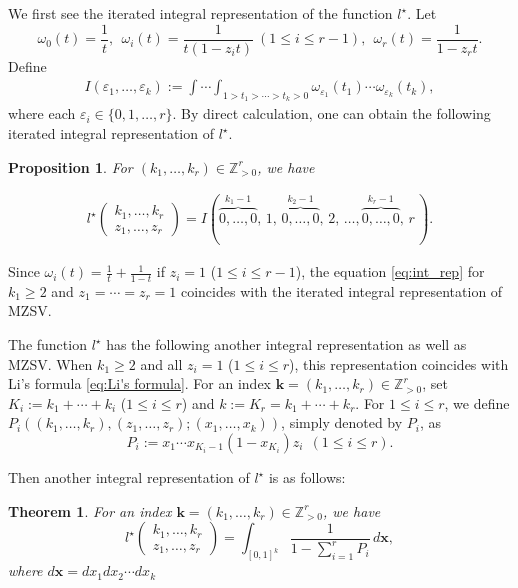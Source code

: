 \documentclass[12pt,a4paper]{article}
\newtheorem{thm}[defi]{Theorem}
\newtheorem{prop}[defi]{Proposition}
\theoremstyle{remark}
\begin{document}
We first see the iterated integral representation of 
the function $l^{\star}$. Let
\[ \omega_0(t)=\dfrac{1}{t},\ \ 
\omega_i(t)=\dfrac{1}{t(1-z_it)}\ (1\le i\le r-1),\ \ 
\omega_r(t)=\dfrac{1}{1-z_rt}.\] 
Define
\begin{align*}
I(\varepsilon_1, \ldots ,\varepsilon_k)
:=\displaystyle \int \cdots \int 
_{1>t_1>\cdots >t_k>0}
\omega_{\varepsilon_1}(t_1) \cdots 
\omega_{\varepsilon_k}(t_k),
\end{align*}
where each $\varepsilon_i \in \{ 0, 1, \ldots , r\}$.
By direct calculation, one can obtain the following 
iterated integral representation of $l^{\star}$.
\begin{prop}
For $(k_1, \ldots, k_r)\in \mathbb{Z}_{>0}^r$, we have

\begin{align}\label{eq:int_rep}
l^{\star}
\begin{pmatrix}
k_1, \ldots , k_r \\
z_1, \ldots , z_r
\end{pmatrix}
=
I(\overbrace{0,\ldots,0}^{k_1-1},\, 1,\, \overbrace{0,\ldots,0}^{k_2-1},
\, 2,\, 
\ldots , \overbrace{0,\ldots,0}^{k_r-1}, \,r \,).
\end{align}
\end{prop}
Since $\omega_i(t)
= \frac{1}{t}+\frac{1}{1-t}$ 
if $z_i=1$ ($1\le i \le r-1$), 
the equation \eqref{eq:int_rep}
for $k_1\ge 2$ and $z_1=\cdots =z_r=1$
coincides with
the iterated integral representation of MZSV.


The function $l^{\star}$ has 
the following another
integral representation as well as MZSV. 
When $k_1\ge 2$ and 
all $z_i=1$ ($1\le i \le r$), 
this representation coincides with 
Li's formula \eqref{eq:Li's formula}.
For an index $\boldsymbol{k}=(k_1,\ldots, k_r)\in
\mathbb{Z}_{>0}^r$,
set $K_i:=k_1+\cdots +k_i$ ($1\le i \le r$)
and $k:=K_r=k_1+\cdots +k_r$.
For $1\le i \le r$, we define $P_i((k_1, \ldots, k_r),(z_1,\ldots ,z_r);(x_1,\ldots, x_{k}))$,
simply denoted by $P_i$, as 
\[ P_i:=x_1\cdots x_{K_i-1}(1-x_{K_i})z_i \ \ (1\le i \le r).\]

Then another integral representation of 
$l^{\star}$ is as follows:
\begin{thm}\label{thm:integralprop}
For an index $\boldsymbol{k}=(k_1,\ldots, k_r)\in
\mathbb{Z}_{>0}^r$, 
we have
\begin{equation}\label{eq:anotherint_exp_l}
l^{\star}
\begin{pmatrix}
k_1, \ldots , k_r \\
z_1, \ldots , z_r
\end{pmatrix}= \displaystyle\int_{[0,1]^k}
\dfrac{1}{1- \sum_{i=1}^r P_i}\, d\boldsymbol{x},
\end{equation}
where 
$d\boldsymbol{x}=dx_1 dx_2\cdots dx_{k}$
\end{thm}
\end{document}
